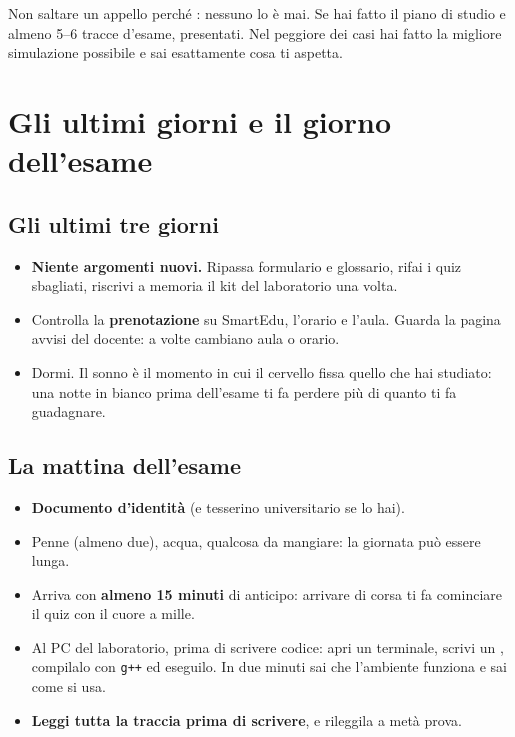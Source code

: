 \begin{trappola}
Non saltare un appello perché : nessuno lo è mai. Se
hai fatto il piano di studio e almeno 5--6 tracce d'esame, presentati. Nel peggiore dei
casi hai fatto la migliore simulazione possibile e sai esattamente cosa ti aspetta.
\end{trappola}

\section{Gli ultimi giorni e il giorno dell'esame}

\subsection*{Gli ultimi tre giorni}

\begin{itemize}
  \item \textbf{Niente argomenti nuovi.} Ripassa formulario e glossario, rifai i quiz
        sbagliati, riscrivi a memoria il kit del laboratorio una volta.
  \item Controlla la \textbf{prenotazione} su SmartEdu, l'orario e l'aula. Guarda la
        pagina avvisi del docente: a volte cambiano aula o orario.
  \item Dormi. Il sonno è il momento in cui il cervello fissa quello che hai studiato:
        una notte in bianco prima dell'esame ti fa perdere più di quanto ti fa
        guadagnare.
\end{itemize}

\subsection*{La mattina dell'esame}

\begin{consiglio}
\begin{itemize}
  \item \textbf{Documento d'identità} (e tesserino universitario se lo hai).
  \item Penne (almeno due), acqua, qualcosa da mangiare: la giornata può essere lunga.
  \item Arriva con \textbf{almeno 15 minuti} di anticipo: arrivare di corsa ti fa
        cominciare il quiz con il cuore a mille.
  \item Al PC del laboratorio, prima di scrivere codice: apri un terminale, scrivi un
        , compilalo con \texttt{g++} ed eseguilo. In due minuti sai che
        l'ambiente funziona e sai come si usa.
  \item \textbf{Leggi tutta la traccia prima di scrivere}, e rileggila a metà prova.
\end{itemize}
\end{consiglio}

